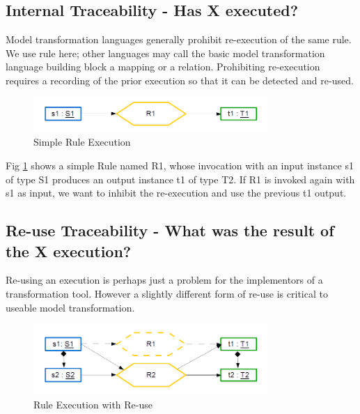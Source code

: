 \documentclass[runningheads,a4paper]{llncs}
\begin{document}
\subsection{Internal Traceability - Has X executed?}

Model transformation languages generally prohibit re-execution of the same rule. We use rule here; other languages may call the basic model transformation language building block a mapping or a relation. Prohibiting re-execution requires a recording of the prior execution so that it can be detected and re-used.

\begin{figure}
  \begin{center}
    \includegraphics[width=3.5in]{FirstExecution.png}
  \end{center}
  \caption{Simple Rule Execution}
  \label{fig:FirstExecution}
\end{figure}

Fig \ref{fig:FirstExecution} shows a simple Rule named R1, whose invocation with an input instance s1 of type S1 produces an output instance t1 of type T2. If R1 is invoked again with s1 as input, we want to inhibit the re-execution and use the previous t1 output.

\subsection{Re-use Traceability - What was the result of the X execution?}

Re-using an execution is perhaps just a problem for the implementors of a transformation tool. However a slightly different form of re-use is critical to useable model transformation.

\begin{figure}
  \begin{center}
    \includegraphics[width=3.5in]{ReferencingExecution.png}
  \end{center}
  \caption{Rule Execution with Re-use}
  \label{fig:ReferencingExecution}
\end{figure}
\end{document}
